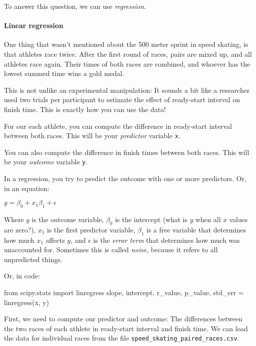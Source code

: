 \documentclass[11pt]{article}
\newenvironment{Shaded}{}{}
\newcommand{\NormalTok}[1]{{#1}}
\newcommand{\ImportTok}[1]{{#1}}
\newcommand{\OperatorTok}[1]{\textcolor[rgb]{0.40,0.40,0.40}{{#1}}}
\begin{document}
To answer this question, we can use \emph{regression}.

    \paragraph{Linear regression}\label{linear-regression}

One thing that wasn't mentioned about the 500 meter sprint in speed
skating, is that athletes race twice. After the first round of races,
pairs are mixed up, and all athletes race again. Their times of both
races are combined, and whoever has the lowest summed time wins a gold
medal.

This is not unlike an experimental manipulation: It sounds a bit like a
researcher used two trials per participant to estimate the effect of
ready-start interval on finish time. This is exactly how you can use the
data!

For our each athlete, you can compute the difference in ready-start
interval between both races. This will be your \emph{predictor} variable
\texttt{x}.

You can also compute the difference in finish times between both races.
This will be your \emph{outcome} variable \texttt{y}.

In a regression, you try to predict the outcome with one or more
predictors. Or, in an equation:

\(y = \beta_{0} + x_{1} \beta_{1} + \epsilon\)

Where \(y\) is the outcome variable, \(\beta_{0}\) is the intercept
(what is \(y\) when all \(x\) values are zero?), \(x_{1}\) is the first
predictor variable, \(\beta_{1}\) is a free variable that determines how
much \(x_{1}\) affects \(y\), and \(\epsilon\) is the \emph{error term}
that determines how much was unaccounted for. Sometimes this is called
\emph{noise}, because it refers to all unpredicted things.

Or, in code:

\begin{Shaded}
\begin{Highlighting}[]
\ImportTok{from} \NormalTok{scipy.stats }\ImportTok{import} \NormalTok{linregress}
\NormalTok{slope, intercept, r_value, p_value, std_err }\OperatorTok{=} \NormalTok{linregress(x, y)}
\end{Highlighting}
\end{Shaded}

    First, we need to compute our predictor and outcome: The differences
between the two races of each athlete in ready-start interval and finish
time. We can load the data for individual races from the file
\texttt{speed\_skating\_paired\_races.csv}.
\end{document}
